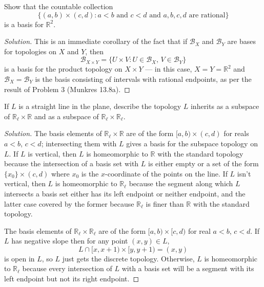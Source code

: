 \documentclass[11pt]{scrartcl}
\providecommand{\RR}{\mathbb R}
\newenvironment{soln}{\begin{proof}[Solution]}{\end{proof}}
\begin{document}
\begin{problem*}
    [Munkres 16.6]
    Show that the countable collection
    \begin{equation*}
	\{(a,b)\times(c,d) : a<b\text{ and }c<d\text{ and $a,b,c,d$ are rational}\}
    \end{equation*}
    is a basis for $\RR^2$.
\end{problem*}

\begin{soln}
    This is an immediate corollary of the fact that
    if $\mathcal B_X$ and $\mathcal B_Y$ are bases for
    topologies on $X$ and $Y$, then
    \begin{equation*}
	\mathcal B_{X\times Y} =
	\{ U\times V : U\in\mathcal B_X,\,V\in\mathcal B_Y\}
    \end{equation*}
    is a basis for the product topology on $X\times Y$ ---
    in this case, $X = Y = \RR^2$
    and $\mathcal B_X = \mathcal B_Y$ is the basis consisting of
    intervals with rational endpoints, as per the result of
    Problem 3 (Munkres 13.8a).
\end{soln}

\pagebreak
\begin{problem*}
    [Munkres 16.8]
    If $L$ is a straight line in the plane, describe the topology $L$ inherits
    as a subspace of $\RR_\ell\times\RR$ and as a subspace of $\RR_\ell\times\RR_\ell$.
\end{problem*}

\begin{soln}
    The basis elements of $\RR_\ell\times\RR$ are of the form
    $[a,b)\times(c,d)$ for reals $a<b$, $c<d$;
    intersecting them with $L$ gives a basis for the subspace topology on $L$.
    If $L$ is vertical, then $L$ is homeomorphic to $\RR$ with the standard topology
    because the intersection of a basis set with $L$ is either empty
    or a set of the form $\{x_0\}\times(c,d)$ where $x_0$ is the $x$-coordinate
    of the points on the line.
    If $L$ isn't vertical, then $L$ is homeomorphic to $\RR_\ell$
    because the segment along which $L$ intersects a basis set
    either has its left endpoint or neither endpoint,
    and the latter case covered by the former because $\RR_\ell$ is finer
    than $\RR$ with the standard topology.

    The basis elements of $\RR_\ell\times\RR_\ell$ are of the form
    $[a,b)\times[c,d)$ for real $a<b$, $c<d$.
    If $L$ has negative slope then for any point $(x,y)\in L$,
    \begin{equation*}
	L\cap[x,x+1)\times[y,y+1) = (x,y)
    \end{equation*}
    is open in $L$, so $L$ just gets the discrete topology.
    Otherwise, $L$ is homeomorphic to $\RR_\ell$
    because every intersection of $L$ with a basis set
    will be a segment with its left endpoint but not its right endpoint.
\end{soln}
\end{document}
